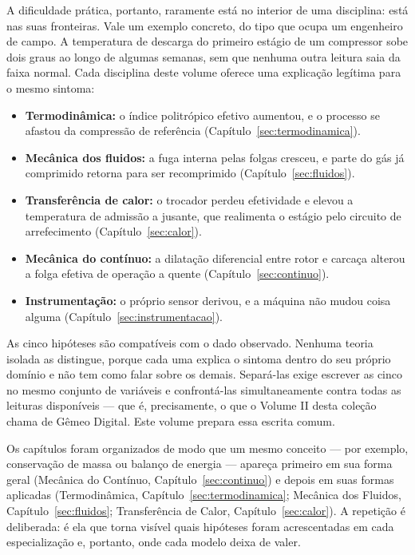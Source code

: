 \documentclass[12pt,a4paper]{article}
\numberwithin{equation}{section}
\numberwithin{table}{section}
\numberwithin{figure}{section}
\begin{document}
A dificuldade prática, portanto, raramente está no interior de uma disciplina:
está nas suas fronteiras. Vale um exemplo concreto, do tipo que ocupa um
engenheiro de campo. A temperatura de descarga do primeiro estágio de um
compressor sobe dois graus ao longo de algumas semanas, sem que nenhuma outra
leitura saia da faixa normal. Cada disciplina deste volume oferece uma
explicação legítima para o mesmo sintoma:

\begin{itemize}
	\item \textbf{Termodinâmica:} o índice politrópico efetivo aumentou, e o
	processo se afastou da compressão de referência
	(Capítulo~\ref{sec:termodinamica}).
	\item \textbf{Mecânica dos fluidos:} a fuga interna pelas folgas cresceu, e
	parte do gás já comprimido retorna para ser recomprimido
	(Capítulo~\ref{sec:fluidos}).
	\item \textbf{Transferência de calor:} o trocador perdeu efetividade e
	elevou a temperatura de admissão a jusante, que realimenta o estágio pelo
	circuito de arrefecimento (Capítulo~\ref{sec:calor}).
	\item \textbf{Mecânica do contínuo:} a dilatação diferencial entre rotor e
	carcaça alterou a folga efetiva de operação a quente
	(Capítulo~\ref{sec:continuo}).
	\item \textbf{Instrumentação:} o próprio sensor derivou, e a máquina não
	mudou coisa alguma (Capítulo~\ref{sec:instrumentacao}).
\end{itemize}

As cinco hipóteses são compatíveis com o dado observado. Nenhuma teoria
isolada as distingue, porque cada uma explica o sintoma dentro do seu próprio
domínio e não tem como falar sobre os demais. Separá-las exige escrever as
cinco no mesmo conjunto de variáveis e confrontá-las simultaneamente contra
todas as leituras disponíveis --- que é, precisamente, o que o Volume II desta
coleção chama de Gêmeo Digital. Este volume prepara essa escrita comum.

Os capítulos foram organizados de modo que um mesmo conceito --- por exemplo,
conservação de massa ou balanço de energia --- apareça primeiro em sua forma
geral (Mecânica do Contínuo, Capítulo~\ref{sec:continuo}) e depois em suas
formas aplicadas (Termodinâmica, Capítulo~\ref{sec:termodinamica}; Mecânica
dos Fluidos, Capítulo~\ref{sec:fluidos}; Transferência de Calor,
Capítulo~\ref{sec:calor}). A repetição é deliberada: é ela que torna visível
quais hipóteses foram acrescentadas em cada especialização e, portanto, onde
cada modelo deixa de valer.
\end{document}
